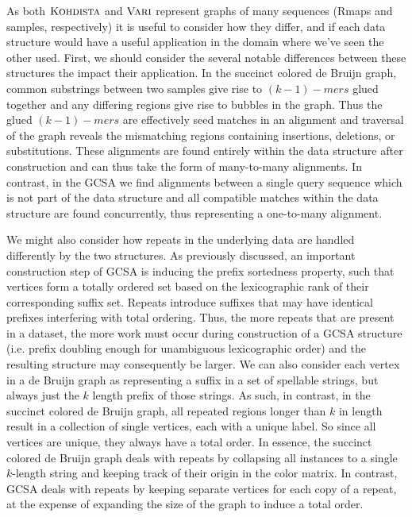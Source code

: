 As both $\mbox{\rm \textsc{Kohdista}}$ and $\mbox{\rm {\sc Vari}}$ represent graphs of many sequences (Rmaps and samples, respectively) it is useful to consider how they differ, and if each data structure would have a useful application in the  domain where we've seen the other used.  First, we should consider the several notable differences between these structures the impact their application.  In the succinct colored de Bruijn graph, common substrings between two samples give rise to $(k-1)-mers$ glued together and any differing regions give rise to bubbles in the graph.  Thus the glued $(k-1)-mers$ are effectively seed matches in an alignment and traversal of the graph reveals the mismatching regions containing insertions, deletions, or substitutions.  These alignments are found entirely within the data structure after construction and can thus take the form of many-to-many alignments. In contrast, in the GCSA we find alignments between a single query sequence which is not part of the data structure and all compatible matches within the data structure are found concurrently, thus representing a one-to-many alignment.  

We might also consider how repeats in the underlying data are handled differently by the two structures.  As previously discussed, an important construction step of GCSA is inducing the prefix sortedness property, such that vertices form a totally ordered set based on the lexicographic rank of their corresponding suffix set. Repeats introduce suffixes that may  have identical prefixes interfering with total ordering. Thus, the more repeats that are present in a dataset, the more work must occur during construction of a GCSA structure (i.e. prefix doubling enough for unambiguous lexicographic order) and the resulting structure may consequently be larger.  We can also consider each vertex in a de Bruijn graph as representing a suffix in a set of spellable strings, but always just the $k$ length prefix of those strings.  As such, in contrast, in the succinct colored de Bruijn graph, all repeated regions longer than $k$ in length result in a collection of single vertices, each with a unique label.  So since all vertices are unique, they always have a total order. In essence, the succinct colored de Bruijn graph deals with repeats by collapsing all instances to a single $k$-length string and keeping track of their origin in the color matrix.   In contrast, GCSA deals with repeats by keeping separate vertices for each copy of a repeat, at the expense of expanding the size of the graph to induce a total order. 

